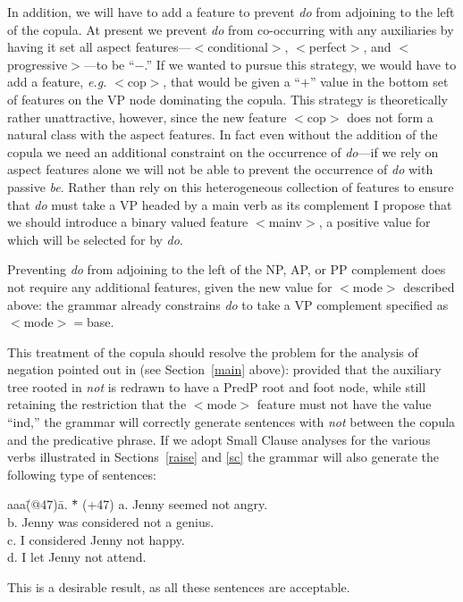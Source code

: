 In addition, we will have to add a feature to prevent {\em do} from
adjoining to the left of the copula.  At present we prevent {\em do}
from co-occurring with any auxiliaries by having it set all aspect
features---$<$conditional$>$, $<$perfect$>$, and $<$progressive$>$---to
be ``$-$.'' If we wanted to pursue this strategy, we would have to add a
feature, {\em e.g.\/} $<$cop$>$, that would be given a ``$+$'' value in
the bottom set of features on the VP node dominating the copula. This
strategy is theoretically rather unattractive, however, since the new
feature $<$cop$>$ does not form a natural class with the aspect
features. In fact even without the addition of the copula we need an
additional constraint on the occurrence of {\em do\/}---if we rely on
aspect features alone we will not be able to prevent the occurrence of
{\em do} with passive {\em be\/}.  Rather than rely on this
heterogeneous collection of features to ensure that {\em do} must take a
VP headed by a main verb as its complement I propose that we should
introduce a binary valued feature $<$mainv$>$, a positive value for
which will be selected for by {\em do\/}.

Preventing {\em do} from adjoining to the left of the NP, AP, or PP
complement does not require any additional features, given the new value
for $<$mode$>$ described above: the grammar already constrains {\em do}
to take a VP complement specified as $<$mode$>=$base.

This treatment of the copula should resolve the problem for the analysis
of negation pointed out in \cite[p.7]{za89} (see Section~\ref{main}
above): provided that the auxiliary tree rooted in {\em not\/} is
redrawn to have a PredP root and foot node, while still retaining the
restriction that the $<$mode$>$ feature must not have the value ``ind,''
the grammar will correctly generate sentences with {\em not} between the
copula and the predicative phrase. If we adopt Small Clause analyses for
the various verbs illustrated in Sections~\ref{raise} and \ref{sc} the
grammar will also generate the following type of sentences:
\begin{tabbing}
aaa\=(@47)\= a. \= *\= \kill
   \>(+47)\> a. \>  \> Jenny seemed not angry.      \\
   \>     \> b. \>  \> Jenny was considered not a genius. \\
   \>     \> c. \>  \> I considered Jenny not happy. \\
   \>     \> d. \>  \> I let Jenny not attend.
\end{tabbing}
This is a desirable result, as all these sentences are acceptable.

